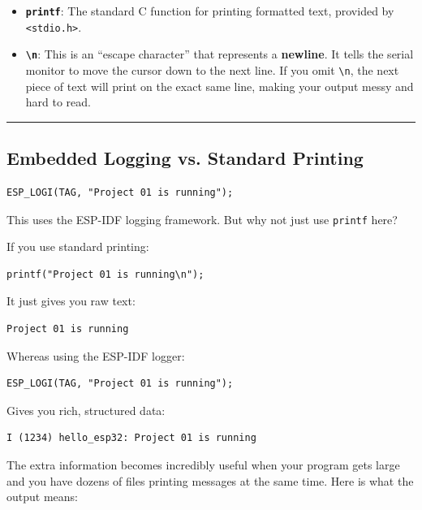 \documentclass[11pt]{article}
\begin{document}
\begin{itemize}
    \item \textbf{\texttt{printf}}: The standard C function for printing formatted text, provided by \texttt{\textless stdio.h\textgreater}.
    
    \item \textbf{\texttt{\textbackslash{}n}}: This is an ``escape character'' that represents a \textbf{newline}. It tells the serial monitor to move the cursor down to the next line. If you omit \texttt{\textbackslash{}n}, the next piece of text will print on the exact same line, making your output messy and hard to read.
\end{itemize}

\bigskip
\noindent\rule{\textwidth}{0.4pt}
\bigskip

\subsection*{ Embedded Logging vs. Standard Printing}

\begin{verbatim}
ESP_LOGI(TAG, "Project 01 is running");
\end{verbatim}

This uses the ESP-IDF logging framework. But why not just use \texttt{printf} here?

If you use standard printing:

\begin{verbatim}
printf("Project 01 is running\n");
\end{verbatim}

It just gives you raw text:

\begin{verbatim}
Project 01 is running
\end{verbatim}

Whereas using the ESP-IDF logger:

\begin{verbatim}
ESP_LOGI(TAG, "Project 01 is running");
\end{verbatim}

Gives you rich, structured data:

\begin{verbatim}
I (1234) hello_esp32: Project 01 is running
\end{verbatim}

The extra information becomes incredibly useful when your program gets large and you have dozens of files printing messages at the same time. Here is what the output means:
\end{document}
